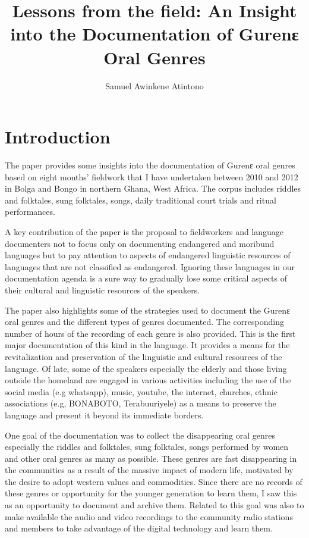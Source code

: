 \documentclass[output=paper,colorlinks,citecolor=brown]{langscibook}
\author{Samuel Awinkene Atintono \affiliation{Accra College of Education}}
\title{Lessons from the field: An Insight into the Documentation of 
 Gurenɛ Oral Genres
}
\begin{document}
\maketitle

\section{Introduction} 
The paper provides some insights into the documentation of Gurenɛ oral genres based on eight months’ fieldwork that I have undertaken between 2010 and 2012 in Bolga and Bongo in northern Ghana, West Africa. The corpus includes riddles and folktales, sung folktales, songs, daily traditional court trials and ritual performances. 

A key contribution of the paper is the proposal to fieldworkers and language documenters not to focus only on documenting endangered and moribund languages but to pay attention to aspects of endangered linguistic resources of languages that are not classified as endangered. Ignoring these languages in our documentation agenda is a sure way to gradually lose some critical aspects of their cultural and linguistic resources of the speakers.

The paper also highlights some of the strategies used to document the Gurenɛ oral genres and the different types of genres documented. The corresponding number of hours of the recording of each genre is also provided. This is the first major documentation of this kind in the language. It provides a means for the revitalization and preservation of the linguistic and cultural resources of the language. Of late, some of the speakers especially the elderly and those living outside the homeland are engaged in various activities including the use of the social media (e.g whatsapp), music, youtube, the internet, churches, ethnic associations (e.g, BONABOTO, Terabuuriyele)   as a means to preserve the language and present it beyond its immediate borders.

One goal of the documentation was to collect the disappearing oral genres especially the riddles and folktales, sung folktales, songs performed by women and other oral genres as many as possible. These genres are fast disappearing in the communities as a result of the massive impact of modern life, motivated by the desire to adopt western values and commodities. Since there are no records of these genres or opportunity for the younger generation to learn them, I saw this as an opportunity to document and archive them. Related to this goal was also to make available the audio and video recordings to the community radio stations and members to take advantage of the digital technology and learn them. 
\end{document}
